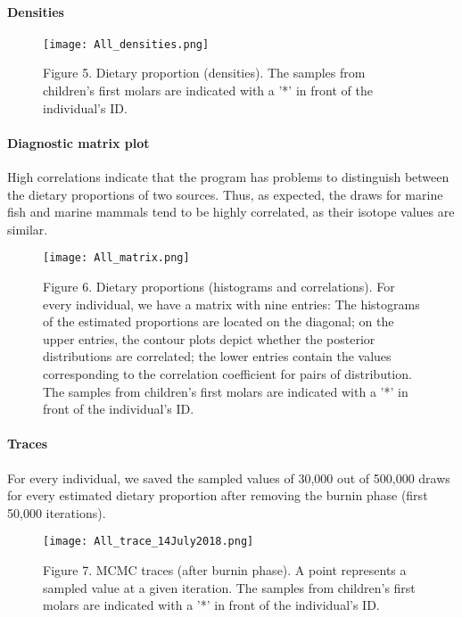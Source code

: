 \documentclass[]{article}
\let\oldparagraph\paragraph
\renewcommand{\paragraph}[1]{\oldparagraph{#1}\mbox{}}
\begin{document}
\hypertarget{densities}{%
\paragraph{Densities}\label{densities}}

\begin{figure}
\centering
\texttt{[image: All\_densities.png]}
\caption{Figure 5. Dietary proportion (densities). The samples from
children's first molars are indicated with a '*' in front of the
individual's ID.}
\end{figure}

\hypertarget{diagnostic-matrix-plot}{%
\paragraph{Diagnostic matrix plot}\label{diagnostic-matrix-plot}}

High correlations indicate that the program has problems to distinguish
between the dietary proportions of two sources. Thus, as expected, the
draws for marine fish and marine mammals tend to be highly correlated,
as their isotope values are similar.

\begin{figure}
\centering
\texttt{[image: All\_matrix.png]}
\caption{Figure 6. Dietary proportions (histograms and correlations).
For every individual, we have a matrix with nine entries: The histograms
of the estimated proportions are located on the diagonal; on the upper
entries, the contour plots depict whether the posterior distributions
are correlated; the lower entries contain the values corresponding to
the correlation coefficient for pairs of distribution. The samples from
children's first molars are indicated with a '*' in front of the
individual's ID.}
\end{figure}

\hypertarget{traces}{%
\paragraph{Traces}\label{traces}}

For every individual, we saved the sampled values of 30,000 out of
500,000 draws for every estimated dietary proportion after removing the
burnin phase (first 50,000 iterations).

\begin{figure}
\centering
\texttt{[image: All\_trace\_14July2018.png]}
\caption{Figure 7. MCMC traces (after burnin phase). A point represents
a sampled value at a given iteration. The samples from children's first
molars are indicated with a '*' in front of the individual's ID.}
\end{figure}
\end{document}
